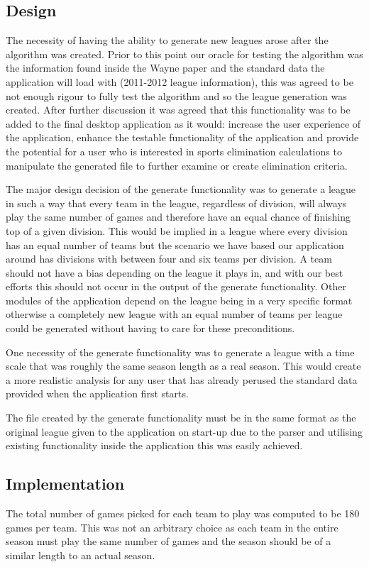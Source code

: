 \subsection{Design}
The necessity of having the ability to generate new leagues arose
after the algorithm was created. Prior to this point our oracle for
testing the algorithm was the information found inside the Wayne paper
\cite{Wayne} and the standard data the application will load with
(2011-2012 league information), this was agreed to be not enough
rigour to fully test the algorithm and so the league generation was
created. After further discussion it was agreed that this
functionality was to be added to the final desktop application as it
would: increase the user experience of the application, enhance the
testable functionality of the application and provide the potential
for a user who is interested in sports elimination calculations to
manipulate the generated file to further examine or create elimination
criteria.

The major design decision of the generate functionality was to
generate a league in such a way that every team in the league,
regardless of division, will always play the same number of games and
therefore have an equal chance of finishing top of a given
division. This would be implied in a league where every division has
an equal number of teams but the scenario we have based our
application around has divisions with between four and six teams per
division. A team should not have a bias depending on the league it
plays in, and with our best efforts this should not occur in the
output of the generate functionality. Other
modules of the application depend on the league being in a very
specific format otherwise a completely new league with an equal number
of teams per league could be generated without having to care for
these preconditions. 

One necessity of the generate functionality was to generate a league
with a time scale that was roughly the same season length as a real
season. This would create a more realistic analysis for any user that
has already perused the standard data provided when the application
first starts.

The file created by the generate functionality must be in the same
format as the original league given to the application on start-up due
to the parser and utilising existing functionality inside the
application this was easily achieved.

\subsection{Implementation}
The total number of games picked for each team to play was computed to
be 180 games per team. This was not an arbitrary choice as each team
in the entire season must play the same number of games and the season
should be of a similar length to an actual season.

